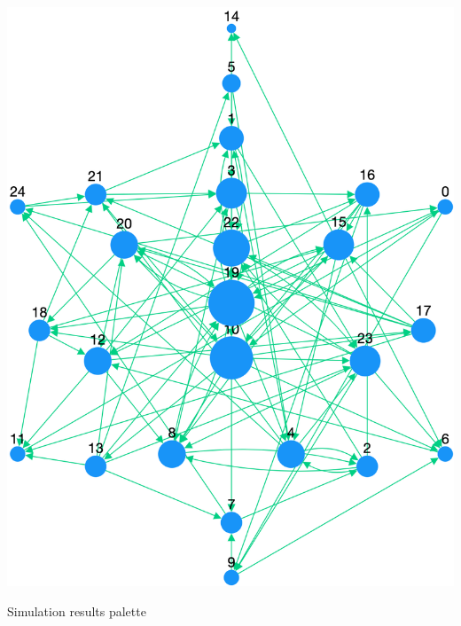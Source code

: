 \documentclass[landscape,paperwidth=70in,paperheight=46in,fontscale=0.225]{baposter} %
\begin{document}
\begin{poster}
{\begin{minipage}{0.3\linewidth}
\includegraphics[trim = -4.0in 0in 0in 0in, clip, scale=0.06]{figures/gnm-25-100_pngraph.png} 

\end{minipage}



\vspace{0.3in}


\begin{minipage}{0.35\linewidth}
Simulation results palette


\end{minipage}}
\end{poster}
\end{document}
